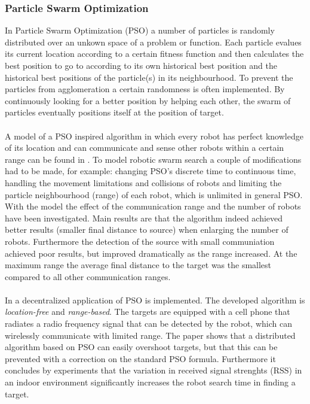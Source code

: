 	\subsubsection{Particle Swarm Optimization}
		In Particle Swarm Optimization (PSO) a number of particles is randomly distributed over an unkown space of a problem or function. 
		Each particle evalues its current location according to a certain fitness function and then calculates the best position to go to according to its own historical best position and the historical best positions of the particle(s) in its neighbourhood.
		To prevent the particles from agglomeration a certain randomness is often implemented. 
		By continuously looking for a better position by helping each other, the swarm of particles eventually positions itself at the position of target. \cite{poli2007particle}\\
		\\
		A model of a PSO inspired algorithm in which every robot has perfect knowledge of its location and can communicate and sense other robots within a certain range can be found in \cite{pugh2007inspiring}.
		To model robotic swarm search a couple of modifications had to be made, for example: changing PSO's discrete time to continuous time, handling the movement limitations and collisions of robots and limiting the particle neighbourhood (range) of each robot, which is unlimited in general PSO.
		With the model the effect of the communication range and the number of robots have been investigated.
		Main results are that the algorithm indeed achieved better results (smaller final distance to source) when enlarging the number of robots.
		Furthermore the detection of the source with small communiation achieved poor results, but improved dramatically as the range increased.
		At the maximum range the average final distance to the target was the smallest compared to all other communication ranges.\\
		\\
		In \cite{derr2009multi} a decentralized application of PSO is implemented.
		The developed algorithm is \emph{location-free} and \emph{range-based}.
		The targets are equipped with a cell phone that radiates a radio frequency signal that can be detected by the robot, which can wirelessly communicate with limited range.
		The paper shows that a distributed algorithm based on PSO can easily overshoot targets, but that this can be prevented with a correction on the standard PSO formula.
		Furthermore it concludes by experiments that the variation in received signal strenghts (RSS) in an indoor environment significantly increases the robot search time in finding a target.

